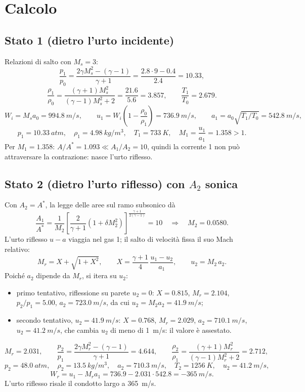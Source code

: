 \documentclass[11pt,a4paper]{article}
\newcommand{\uma}{u-a}
\newcommand{\Mr}{M_{r}}
\begin{document}
\section{Calcolo}\label{sec:calcolo}

\subsection{Stato 1 (dietro l'urto incidente)}
Relazioni di salto con $M_s=3$:
\[
  \frac{p_1}{p_0}=\frac{2\gamma M_s^2-(\gamma-1)}{\gamma+1}=\frac{\num{2.8}\cdot9-\num{0.4}}{\num{2.4}}=\num{10.33},
\]
\[
  \frac{\rho_1}{\rho_0}=\frac{(\gamma+1)M_s^2}{(\gamma-1)M_s^2+2}=\frac{\num{21.6}}{\num{5.6}}=\num{3.857},
  \qquad \frac{T_1}{T_0}=\num{2.679}.
\]
\[
  W_i=M_sa_0=\SI{994.8}{m/s},\qquad u_1=W_i\left(1-\frac{\rho_0}{\rho_1}\right)=\SI{736.9}{m/s},\qquad
  a_1=a_0\sqrt{T_1/T_0}=\SI{542.8}{m/s},
\]
\[
  p_1=\SI{10.33}{atm},\quad \rho_1=\SI{4.98}{kg/m^3},\quad T_1=\SI{733}{K},\quad
  M_1=\frac{u_1}{a_1}=\num{1.358}>1 .
\]
Per $M_1=\num{1.358}$: $A/A^*=\num{1.093}\ll A_1/A_2=10$, quindi la corrente 1 non può attraversare la
contrazione: nasce l'urto riflesso.

\subsection{Stato 2 (dietro l'urto riflesso) con $A_2$ sonica}
Con $A_2=A^*$, la legge delle aree sul ramo subsonico dà
\[
  \frac{A_1}{A^*}=\frac1{M_2}\left[\frac{2}{\gamma+1}\left(1+\delta M_2^2\right)\right]^{\frac{\gamma+1}{2(\gamma-1)}}=10
  \quad\Rightarrow\quad M_2=\num{0.0580}.
\]
L'urto riflesso $\uma$ viaggia nel gas 1; il salto di velocità fissa il suo Mach relativo:
\[
  \Mr=X+\sqrt{1+X^2},\qquad X=\frac{\gamma+1}{4}\,\frac{u_1-u_2}{a_1},
  \qquad u_2=M_2\,a_2 .
\]
Poiché $a_2$ dipende da $\Mr$, si itera su $u_2$:
\begin{itemize}
  \item primo tentativo, riflessione su parete $u_2=0$: $X=\num{0.815}$, $\Mr=\num{2.104}$,
    $p_2/p_1=\num{5.00}$, $a_2=\SI{723.0}{m/s}$, da cui $u_2=M_2a_2=\SI{41.9}{m/s}$;
  \item secondo tentativo, $u_2=\SI{41.9}{m/s}$: $X=\num{0.768}$, $\Mr=\num{2.029}$, $a_2=\SI{710.1}{m/s}$,
    $u_2=\SI{41.2}{m/s}$, che cambia $u_2$ di meno di \SI{1}{m/s}: il valore è assestato.
\end{itemize}
\[
  \Mr=\num{2.031},\qquad \frac{p_2}{p_1}=\frac{2\gamma\Mr^2-(\gamma-1)}{\gamma+1}=\num{4.644},\qquad
  \frac{\rho_2}{\rho_1}=\frac{(\gamma+1)\Mr^2}{(\gamma-1)\Mr^2+2}=\num{2.712},
\]
\[
  p_2=\SI{48.0}{atm},\quad \rho_2=\SI{13.5}{kg/m^3},\quad a_2=\SI{710.3}{m/s},\quad T_2=\SI{1256}{K},\quad
  u_2=\SI{41.2}{m/s},
\]
\[
  W_r=u_1-\Mr a_1=\num{736.9}-\num{2.031}\cdot\num{542.8}=\SI{-365}{m/s}.
\]
L'urto riflesso risale il condotto largo a \SI{365}{m/s}.
\end{document}
